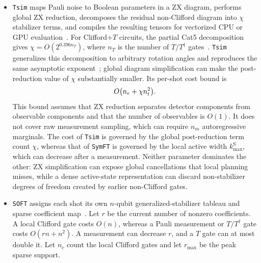 \documentclass[a4paper,onecolumn,unpublished]{quantumarticle}
\DeclarePairedDelimiter\rbra{\lparen}{\rparen}
\newcommand{\tFont}[1]{\texttt{#1}}
\newcommand{\symft}{\tFont{SymFT}}
\newcommand{\soft}{\tFont{SOFT}}
\newcommand{\tsim}{\tFont{Tsim}}
\newcommand{\clifft}{\tFont{Clifft}}
\begin{document}
\begin{itemize}
    This equality is conditional: reordering, fusion, or different coordinate-update choices can change the compiled trajectory, so we retain distinct superscripts.
    Thus, \symft{} does not necessarily have a smaller exponential parameter.
    Its direct updates in stabilizer coordinates avoid localization-induced dense Clifford sweeps, and its symbolic layer replaces \clifft{}'s online $n$-bit Pauli-frame work with sign evaluation costing $O(d)$.
    For local fault-tolerant circuits with sparse symbolic signs, \symft{} replaces the physical-qubit factor $n$ by the sparsity parameter $d$.
    \item \tsim{} maps Pauli noise to Boolean parameters in a ZX diagram, performs global ZX reduction, decomposes the residual non-Clifford diagram into $\chi$ stabilizer terms, and compiles the resulting tensors for vectorized CPU or GPU evaluation~\cite{HLZ26}.
    For Clifford+$T$ circuits, the partial Cat5 decomposition gives $\chi=O(2^{0.396n_T})$, where $n_T$ is the number of $T/T^\dagger$ gates~\cite{KWV22}.
    \tsim{} generalizes this decomposition to arbitrary rotation angles and reproduces the same asymptotic exponent~\cite{HLZ26}; global diagram simplification can make the post-reduction value of $\chi$ substantially smaller.
    Its per-shot cost bound is
    \begin{equation*}
        O\rbra*{n_e + \chi n_t^2}.
    \end{equation*}
    This bound assumes that ZX reduction separates detector components from observable components and that the number of observables is $O(1)$. It does not cover raw measurement sampling, which can require $n_m$ autoregressive marginals.
    The cost of \tsim{} is governed by the global post-reduction term count $\chi$, whereas that of \symft{} is governed by the local active width $k_{\max}^{\mathrm S}$, which can decrease after a measurement.
    Neither parameter dominates the other: ZX simplification can expose global cancellations that local planning misses, while a dense active-state representation can discard non-stabilizer degrees of freedom created by earlier non-Clifford gates.
    \item \soft{} assigns each shot its own $n$-qubit generalized-stabilizer tableau and sparse coefficient map~\cite{LZZ+25}.
    Let $r$ be the current number of nonzero coefficients.  
    A local Clifford gate costs $O(n)$, whereas a Pauli measurement or $T/T^\dagger$ gate costs $O(rn+n^2)$. A measurement can decrease $r$, and a $T$ gate can at most double it.
    Let $n_c$ count the local Clifford gates and let $r_{\max}$ be the peak sparse support. 

\end{itemize}
\end{document}
